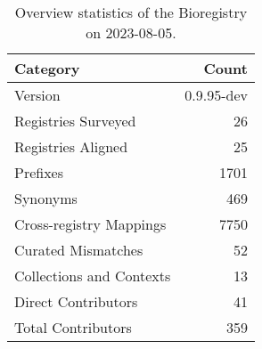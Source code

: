 \begin{table}
\caption{Overview statistics of the Bioregistry on 2023-08-05.}
\label{tab:bioregistry-summary}
\begin{tabular}{lr}
\toprule
Category & Count \\
\midrule
Version & 0.9.95-dev \\
Registries Surveyed & 26 \\
Registries Aligned & 25 \\
Prefixes & 1701 \\
Synonyms & 469 \\
Cross-registry Mappings & 7750 \\
Curated Mismatches & 52 \\
Collections and Contexts & 13 \\
Direct Contributors & 41 \\
Total Contributors & 359 \\
\bottomrule
\end{tabular}
\end{table}
